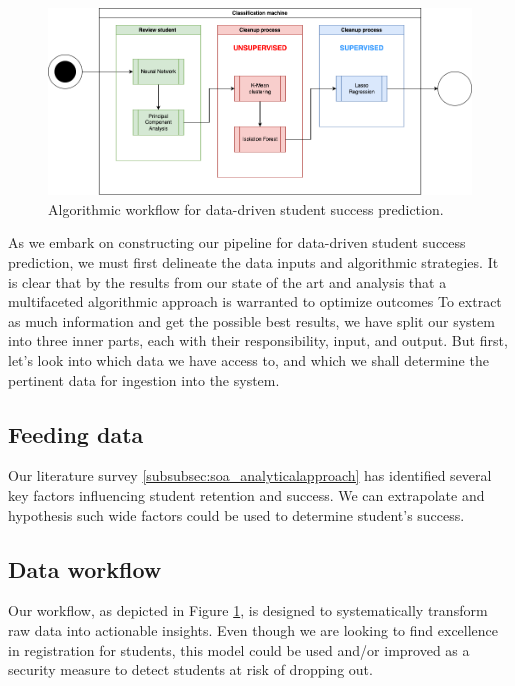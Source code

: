 \documentclass[../main.tex]{subfiles}
\begin{document}
\begin{figure}[h!]      
    \includegraphics[width=1\linewidth]{res//diagram/ML Workflow.png}
    \caption{Algorithmic workflow for data-driven student success prediction.}
    \label{fig:dataworkflow}
\end{figure}
As we embark on constructing our pipeline for data-driven student success prediction, we must first delineate the data inputs and algorithmic strategies. 
It is clear that by the results from our state of the art and analysis that a multifaceted algorithmic approach is warranted to optimize outcomes
To extract as much information and get the possible best results, we have split our system into three inner parts, each with their responsibility, input, and output.
But first, let's look into which data we have access to, and which we shall determine the pertinent data for ingestion into the system.

\subsection{Feeding data}
\label{subsec:conprop_feedingdata}
Our literature survey \ref{subsubsec:soa_analyticalapproach} has identified several key factors influencing student retention and success. We can extrapolate and hypothesis such wide factors could be used to determine student's success.

\subsection{Data workflow}
\label{subsec:concimp_dataworkflow}
Our workflow, as depicted in Figure \ref{fig:dataworkflow}, is designed to systematically transform raw data into actionable insights. Even though we are looking to find excellence in registration for students, this model could be used and/or improved as a security measure to detect students at risk of dropping out.
\end{document}
